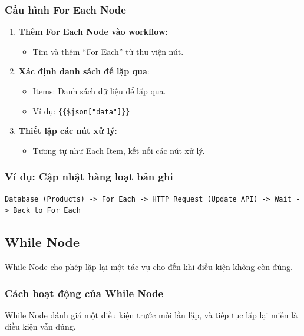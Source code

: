 \subsubsection{Cấu hình For Each Node}

\begin{enumerate}
  \item \textbf{Thêm For Each Node vào workflow}:
  \begin{itemize}
    \item Tìm và thêm ``For Each'' từ thư viện nút.
  \end{itemize}

  \item \textbf{Xác định danh sách để lặp qua}:
  \begin{itemize}
    \item Items: Danh sách dữ liệu để lặp qua.
    \item Ví dụ: \texttt{\{\{\$json["data"]\}\}}
  \end{itemize}

  \item \textbf{Thiết lập các nút xử lý}:
  \begin{itemize}
    \item Tương tự như Each Item, kết nối các nút xử lý.
  \end{itemize}
\end{enumerate}

\subsubsection{Ví dụ: Cập nhật hàng loạt bản ghi}

\begin{verbatim}
Database (Products) -> For Each -> HTTP Request (Update API) -> Wait -> Back to For Each
\end{verbatim}

\subsection{While Node}

While Node cho phép lặp lại một tác vụ cho đến khi điều kiện không còn đúng.

\subsubsection{Cách hoạt động của While Node}

While Node đánh giá một điều kiện trước mỗi lần lặp, và tiếp tục lặp lại miễn là điều kiện vẫn đúng.

